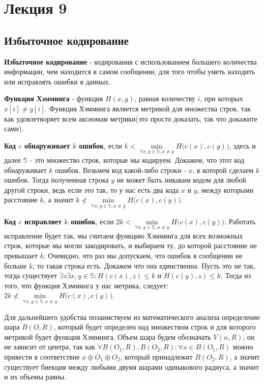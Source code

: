 \documentclass{article}
\begin{document}
\section{Лекция 9}
\subsection{Избыточное кодирование}
\textbf{Избыточное кодирование} - кодирования с использованием большего количества информации, чем находится в самом сообщении, для того чтобы уметь находить или исправлять ошибки в данных. 

\textbf{Функция Хэмминга} - функция $H(x,y)$, равная количеству $i$, при которых $x[i]\neq y[i]$. Функция Хэмминга является метрикой для множества строк, так как удовлетворяет всем аксиомам метрики(это просто доказать, так что докажите сами). 

\textbf{Код $c$ обнаруживает $k$ ошибок}, если $k < \min\limits_{\forall x,y \in \mathbb{S}, x\neq y} H\biggl(c(x),c(y)\biggr)$, здесь и далее $\mathbb{S}$ - это множество строк, которые мы кодируем. Докажем, что этот код обнаруживает $k$ ошибок. Возьмем код какой-либо строки - $x$, в которой сделаем $k$ ошибок. Тогда полученная строка $y$ не может быть никаким кодом для любой другой строки, ведь если это так, то у нас есть два кода $x$ и $y$, между которыми расстояние $k$, а значит $k \nless \min\limits_{\forall x,y \in \mathbb{S}, x\neq y} H\biggl(c(x),c(y)\biggr)$.

\textbf{Код $c$ исправляет $k$ ошибок}, если $2k < \min\limits_{\forall x,y \in \mathbb{S}, x\neq y} H\biggl(c(x),c(y)\biggr)$. Работать исправление будет так, мы считаем функцию Хэмминга для всех возможных строк, которые мы могли закодировать, и выбираем ту, до которой расстояние не превышает $k$. Очевидно, что раз мы допускаем, что ошибок в сообщении не больше $k$, то такая строка есть. Докажем что она единственна. Пусть это не так, тогда существует $\exists z\exists x,y\in\mathbb{S}: H(c(x), z) \leq k$ и $H(c(y), z) \leq k$. Тогда из того, что функция Хэмминга у нас метрика, следует: $2k \nless \min\limits_{\forall x,y \in \mathbb{S}, x\neq y} H\biggl(c(x),c(y)\biggr)$.

Для дальнейшего удобства позаимствуем из математического анализа определение шара $B(O, R)$, который будет определен над множеством строк и для которого метрикой будет функция Хэмминга. Объем шара будем обозначать $V(n, R)$, он не зависит от центра, так как $\forall B(O_1,R), B(O_2, R) : \forall x\in B(O_1, R)$ можно привести в соответствие $x \oplus O_1 \oplus O_2$, который принадлежит $B(O_2, R)$, а значит существует биекция между любыми двумя шарами одинакового радиуса, а значит и их объемы равны. 
\end{document}
